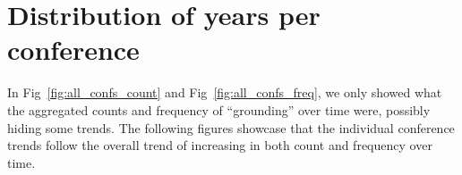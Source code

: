 \documentclass[11pt]{article}
\begin{document}


%


\appendix

\section{Distribution of years per conference}
\label{sec:appendix_years}
In Fig~\ref{fig:all_confs_count} and Fig~\ref{fig:all_confs_freq}, we only showed what the aggregated counts and frequency of ``grounding'' over time were, possibly hiding some trends. The following figures showcase that the individual conference trends follow the overall trend of increasing in both count and frequency over time.
\end{document}
